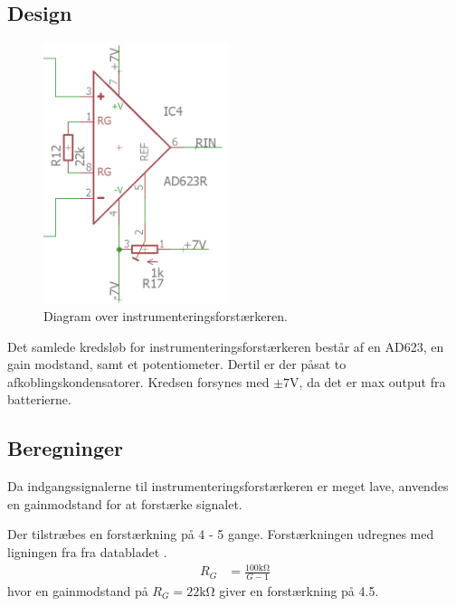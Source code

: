 \subsection{Design}
\begin{figure}
	\centering
	\includegraphics[width=0.48\textwidth]{billeder/instrumentation_amplifier.png}
	\caption{Diagram over instrumenteringsforstærkeren.}
	\label{fig:instrumentation_amplifier}
\end{figure}
Det samlede kredsløb for instrumenteringsforstærkeren består af en AD623, en gain modstand, samt et potentiometer. Dertil er der påsat to afkoblingskondensatorer. Kredsen forsynes med $\pm 7 \si{\volt}$, da det er max output fra batterierne. 

\subsection{Beregninger}
Da indgangssignalerne til instrumenteringsforstærkeren er meget lave, anvendes en gainmodstand for at forstærke signalet.

Der tilstræbes en forstærkning på 4 - 5 gange. Forstærkningen udregnes med ligningen fra fra databladet \cite[side 11]{AD623}.
\begin{align}
	R_G & = \frac{100 \si{\kilo\ohm}}{G-1}
\end{align}
hvor en gainmodstand på $R_G = 22 \si{\kilo\ohm}$ giver en forstærkning på \num{4.5}.